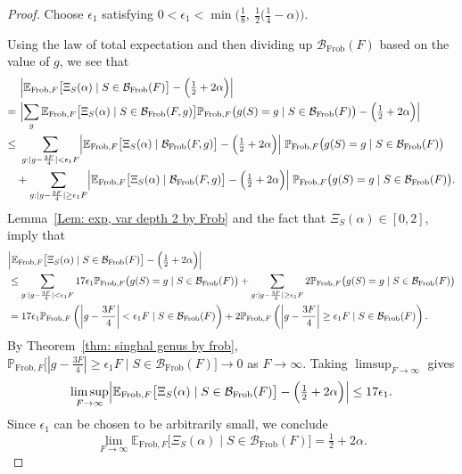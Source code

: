 \documentclass[12pt]{amsart}
\def\B{{\mathcal B}}
\def\E{{\mathbb E}}
\renewcommand{\P}{\mathbb{P}}
\newcommand{\Frob}{\text{Frob}}
\begin{document}
\begin{proof}
Choose $\epsilon_1$ satisfying $0<\epsilon_1<\min\big(\tfrac18,\ \tfrac{1}{2}\big(\tfrac14-\alpha\big)\big)$.

Using the law of total expectation and then dividing up $\B_{\Frob}(F)$ based on the value of $g$, we see that
\begin{align*}
&\ \Bigl|\E_{\Frob,F}\big[\Xi_S(\alpha) \mid S\in\mathcal B_{\Frob}(F) \big]
-\Big(\tfrac12+2\alpha\Big)\Bigr|\\
=&\ \Bigl|
\sum_{g}\E_{\Frob,F}\big[\Xi_S(\alpha)\mid S\in\B_{\Frob}(F,g)\big]
   \P_{\Frob,F}\big(g(S)=g \mid S\in\mathcal B_{\Frob}(F)\big) 
   -\Big(\tfrac12+2\alpha\Big)\Bigr|\\
\le & \ \sum_{g: |g-\frac{3F}{4}|<\epsilon_1 F}
   \Bigl|\E_{\Frob,F}\big[\Xi_S(\alpha)\mid \B_{\Frob}(F,g)\big]
   -\Big(\tfrac12+2\alpha\Big)\Bigr|\;
   \P_{\Frob,F}\big(g(S)=g \mid S\in\mathcal B_{\Frob}(F)\big)\\
& +\sum_{g: |g-\frac{3F}{4}|\ge \epsilon_1 F}
   \Bigl|\E_{\Frob,F}\big[\Xi_S(\alpha)\mid \B_{\Frob}(F,g)\big]-\Big(\tfrac12+2\alpha\Big)\Bigr|\;
   \P_{\Frob,F}\big(g(S)=g \mid S\in\mathcal B_{\Frob}(F)\big).
\end{align*}
Lemma~\ref{Lem: exp, var depth 2 by Frob} and the fact that $\Xi_S(\alpha)\in [0,2]$, imply that
\begin{align*}
&\Bigl|\E_{\Frob,F}\big[\Xi_S(\alpha) \mid S\in\mathcal B_{\Frob}(F) \big]-\Big(\tfrac12+2\alpha\Big)\Bigr|\\
&\le \sum_{g: |g-\frac{3F}{4}|<\epsilon_1 F}
   17 \epsilon_1
   \P_{\Frob,F}\big(g(S)=g \mid S\in\mathcal B_{\Frob}(F)\big)
   +\sum_{g: |g-\frac{3F}{4}| \ge \epsilon_1 F}
   2   \P_{\Frob,F}\big(g(S)=g\mid S\in\mathcal B_{\Frob}(F)\big)\\
&= 17 \epsilon_1
   \P_{\Frob,F}\left(\left|g-\frac{3F}{4}\right|<\epsilon_1 F \mid S\in\mathcal B_{\Frob}(F)\right)
   +2   \P_{\Frob,F}\left(\left|g-\frac{3F}{4}\right| \ge \epsilon_1 F \mid S\in\mathcal B_{\Frob}(F)\right).
\end{align*}
By Theorem~\ref{thm: singhal genus by frob}, $\P_{\Frob,F}\big[|g-\frac{3F}{4}|\ge \epsilon_1 F \mid S\in\mathcal B_{\Frob}(F)\big]\to 0$ as $F\to\infty$.
Taking $\limsup_{F\to\infty}$ gives
\[
\limsup_{F\to\infty}\Bigl|\E_{\Frob,F}\big[\Xi_S(\alpha) \mid S\in\mathcal B_{\Frob}(F) \big]-\Big(\tfrac12+2\alpha\Big)\Bigr|
\le 17\epsilon_1.
\]
Since $\epsilon_1$ can be chosen to be arbitrarily small, we conclude
\[
\lim_{F\to\infty}\E_{\Frob,F}\big[\Xi_S(\alpha) \mid S\in\mathcal B_{\Frob}(F) \big]=\tfrac12+2\alpha.
\]


\end{proof}
\end{document}

